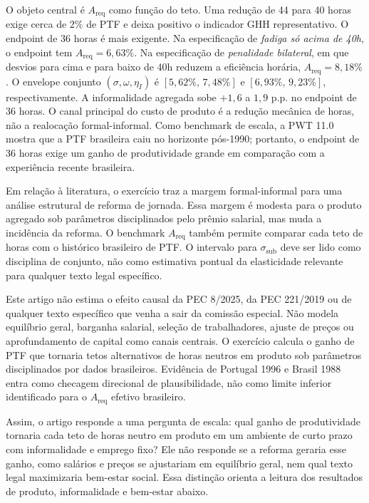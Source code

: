 \documentclass[10pt,twocolumn]{article}
\begin{document}
O objeto central \'e $A_{\text{req}}$ como fun\c{c}\~ao do teto. Uma redu\c{c}\~ao de 44 para 40 horas exige cerca de $2\%$ de PTF e deixa positivo o indicador GHH representativo. O endpoint de 36 horas \'e mais exigente. Na especifica\c{c}\~ao de \emph{fadiga s\'o acima de 40h}, o endpoint tem $A_{\text{req}}=6{,}63\%$. Na especifica\c{c}\~ao de \emph{penalidade bilateral}, em que desvios para cima e para baixo de 40h reduzem a efici\^encia hor\'aria, $A_{\text{req}}=8{,}18\%$. O envelope conjunto $(\sigma,\omega,\eta_I)$ \'e $[5{,}62\%,\,7{,}48\%]$ e $[6{,}93\%,\,9{,}23\%]$, respectivamente. A informalidade agregada sobe $+1{,}6$ a $1{,}9$ p.p. no endpoint de 36 horas. O canal principal do custo de produto \'e a redu\c{c}\~ao mec\^anica de horas, n\~ao a realoca\c{c}\~ao formal-informal. Como benchmark de escala, a PWT 11.0 mostra que a PTF brasileira caiu no horizonte p\'os-1990; portanto, o endpoint de 36 horas exige um ganho de produtividade grande em compara\c{c}\~ao com a experi\^encia recente brasileira.

Em rela\c{c}\~ao \`a literatura, o exerc\'icio traz a margem formal-informal para uma an\'alise estrutural de reforma de jornada. Essa margem \'e modesta para o produto agregado sob par\^ametros disciplinados pelo pr\^emio salarial, mas muda a incid\^encia da reforma. O benchmark $A_{\text{req}}$ tamb\'em permite comparar cada teto de horas com o hist\'orico brasileiro de PTF. O intervalo para $\sigma_{\text{sub}}$ deve ser lido como disciplina de conjunto, n\~ao como estimativa pontual da elasticidade relevante para qualquer texto legal espec\'ifico.

Este artigo n\~ao estima o efeito causal da PEC 8/2025, da PEC 221/2019 ou de qualquer texto espec\'ifico que venha a sair da comiss\~ao especial. N\~ao modela equil\'ibrio geral, barganha salarial, sele\c{c}\~ao de trabalhadores, ajuste de pre\c{c}os ou aprofundamento de capital como canais centrais. O exerc\'icio calcula o ganho de PTF que tornaria tetos alternativos de horas neutros em produto sob par\^ametros disciplinados por dados brasileiros. Evid\^encia de Portugal 1996 \citep{AsaiLopesTondini2024} e Brasil 1988 \citep{GonzagaMenezesFilhoCamargo2003} entra como checagem direcional de plausibilidade, n\~ao como limite inferior identificado para o $A_{\text{req}}$ efetivo brasileiro.

Assim, o artigo responde a uma pergunta de escala: qual ganho de produtividade tornaria cada teto de horas neutro em produto em um ambiente de curto prazo com informalidade e emprego fixo? Ele n\~ao responde se a reforma geraria esse ganho, como sal\'arios e pre\c{c}os se ajustariam em equil\'ibrio geral, nem qual texto legal maximizaria bem-estar social. Essa distin\c{c}\~ao orienta a leitura dos resultados de produto, informalidade e bem-estar abaixo.
\end{document}
